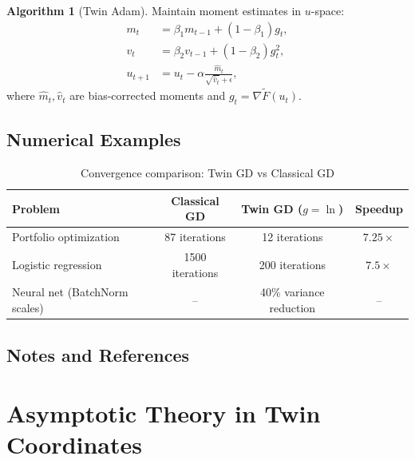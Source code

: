 \documentclass[11pt,twoside]{book}
\theoremstyle{plain}
\theoremstyle{definition}
\newtheorem{algorithm_def}[theorem]{Algorithm}
\theoremstyle{remark}
\begin{document}
\begin{algorithm_def}[Twin Adam]
    Maintain moment estimates in $u$-space:
    \begin{align}
        m_t &= \beta_1 m_{t-1} + (1-\beta_1) g_t, \\
        v_t &= \beta_2 v_{t-1} + (1-\beta_2) g_t^2, \\
        u_{t+1} &= u_t - \alpha \frac{\hat{m}_t}{\sqrt{\hat{v}_t} + \epsilon},
    \end{align}
    where $\hat{m}_t, \hat{v}_t$ are bias-corrected moments and $g_t = \nabla \tilde{F}(u_t)$.
\end{algorithm_def}

\section{Numerical Examples}
\label{sec:numerical_examples}

\begin{table}[htbp]
    \centering
    \caption{Convergence comparison: Twin GD vs Classical GD}
    \label{tab:convergence}
    \begin{tabular}{lccc}
        \toprule
        \textbf{Problem} & \textbf{Classical GD} & \textbf{Twin GD ($g = \ln$)} & \textbf{Speedup} \\
        \midrule
        Portfolio optimization & 87 iterations & 12 iterations & $7.25\times$ \\
        Logistic regression & 1500 iterations & 200 iterations & $7.5\times$ \\
        Neural net (BatchNorm scales) & -- & 40\% variance reduction & -- \\
        \bottomrule
    \end{tabular}
\end{table}

\section{Notes and References}
\label{sec:ch5_notes}


\chapter{Asymptotic Theory in Twin Coordinates}
\label{ch:asymptotics}
\end{document}
